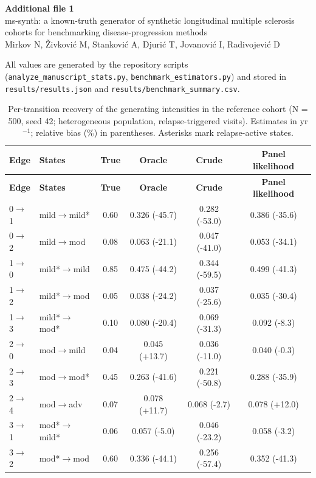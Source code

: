 \documentclass[11pt,a4paper]{article}
\begin{document}
\begin{center}{\large\bfseries Additional file 1}\\[4pt]
ms-synth: a known-truth generator of synthetic longitudinal multiple sclerosis cohorts for benchmarking disease-progression methods\\[2pt]
{\small Mirkov N, \v{Z}ivkovi\'{c} M, Stankovi\'{c} A, Djuri\'{c} T, Jovanovi\'{c} I, Radivojevi\'{c} D}\end{center}
All values are generated by the repository scripts (\texttt{analyze\_manuscript\_stats.py}, \texttt{benchmark\_estimators.py}) and stored in \texttt{results/results.json} and \texttt{results/benchmark\_summary.csv}.

\small
\begin{longtable}{llcccc}
\caption{Per-transition recovery of the generating intensities in the reference cohort (N = 500, seed 42; heterogeneous population, relapse-triggered visits). Estimates in yr$^{-1}$; relative bias (\%) in parentheses. Asterisks mark relapse-active states.}\label{tab:S1}\\
\toprule
\textbf{Edge} & \textbf{States} & \textbf{True} & \textbf{Oracle} & \textbf{Crude} & \textbf{Panel likelihood}\\
\midrule\endfirsthead
\toprule \textbf{Edge} & \textbf{States} & \textbf{True} & \textbf{Oracle} & \textbf{Crude} & \textbf{Panel likelihood}\\ \midrule\endhead
0$\to$1 & mild$\to$mild* & 0.60 & 0.326 (-45.7) & 0.282 (-53.0) & 0.386 (-35.6) \\
0$\to$2 & mild$\to$mod & 0.08 & 0.063 (-21.1) & 0.047 (-41.0) & 0.053 (-34.1) \\
1$\to$0 & mild*$\to$mild & 0.85 & 0.475 (-44.2) & 0.344 (-59.5) & 0.499 (-41.3) \\
1$\to$2 & mild*$\to$mod & 0.05 & 0.038 (-24.2) & 0.037 (-25.6) & 0.035 (-30.4) \\
1$\to$3 & mild*$\to$mod* & 0.10 & 0.080 (-20.4) & 0.069 (-31.3) & 0.092 (-8.3) \\
2$\to$0 & mod$\to$mild & 0.04 & 0.045 (+13.7) & 0.036 (-11.0) & 0.040 (-0.3) \\
2$\to$3 & mod$\to$mod* & 0.45 & 0.263 (-41.6) & 0.221 (-50.8) & 0.288 (-35.9) \\
2$\to$4 & mod$\to$adv & 0.07 & 0.078 (+11.7) & 0.068 (-2.7) & 0.078 (+12.0) \\
3$\to$1 & mod*$\to$mild* & 0.06 & 0.057 (-5.0) & 0.046 (-23.2) & 0.058 (-3.2) \\
3$\to$2 & mod*$\to$mod & 0.60 & 0.336 (-44.1) & 0.256 (-57.4) & 0.352 (-41.3) \\

\end{longtable}
\end{document}
